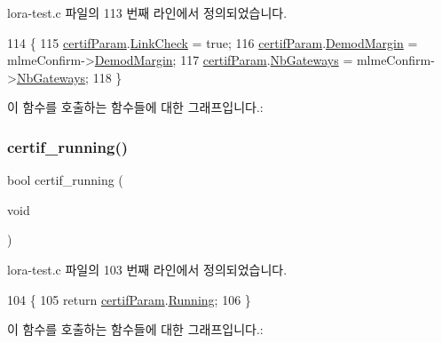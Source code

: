 lora-\/test.\+c 파일의 113 번째 라인에서 정의되었습니다.


\begin{DoxyCode}
114 \{
115   \mbox{\hyperlink{lora-test_8c_afed64ac962fb28f92cbc92acb72b0b7a}{certifParam}}.\mbox{\hyperlink{struct_compliance_test__s_adeaa3c79dc995e74f45bffef6c768edb}{LinkCheck}} = \textcolor{keyword}{true};
116   \mbox{\hyperlink{lora-test_8c_afed64ac962fb28f92cbc92acb72b0b7a}{certifParam}}.\mbox{\hyperlink{struct_compliance_test__s_a60502ba4c33cf0435f086a1a9f1b5116}{DemodMargin}} = mlmeConfirm->\mbox{\hyperlink{structs_mlme_confirm_a60502ba4c33cf0435f086a1a9f1b5116}{DemodMargin}};
117   \mbox{\hyperlink{lora-test_8c_afed64ac962fb28f92cbc92acb72b0b7a}{certifParam}}.\mbox{\hyperlink{struct_compliance_test__s_ac2fbb4be8e3cc46943038a1796010d71}{NbGateways}} = mlmeConfirm->\mbox{\hyperlink{structs_mlme_confirm_ac2fbb4be8e3cc46943038a1796010d71}{NbGateways}};
118 \}
\end{DoxyCode}
이 함수를 호출하는 함수들에 대한 그래프입니다.\+:
\mbox{\label{lora-test_8h_ae856642063d609fa42633f12c85fa318}} 
\subsubsection{\texorpdfstring{certif\+\_\+running()}{certif\_running()}}
{\footnotesize\ttfamily bool certif\+\_\+running (\begin{DoxyParamCaption}\item[{void}]{ }\end{DoxyParamCaption})}



lora-\/test.\+c 파일의 103 번째 라인에서 정의되었습니다.


\begin{DoxyCode}
104 \{
105     \textcolor{keywordflow}{return} \mbox{\hyperlink{lora-test_8c_afed64ac962fb28f92cbc92acb72b0b7a}{certifParam}}.\mbox{\hyperlink{struct_compliance_test__s_ae2e97f1ebd7c956e2c68d1209eabd4b1}{Running}};
106 \}
\end{DoxyCode}
이 함수를 호출하는 함수들에 대한 그래프입니다.\+:
\mbox{\label{lora-test_8h_ad5e51928ecf0cca8d4f33f9e9c10aba4}} 
